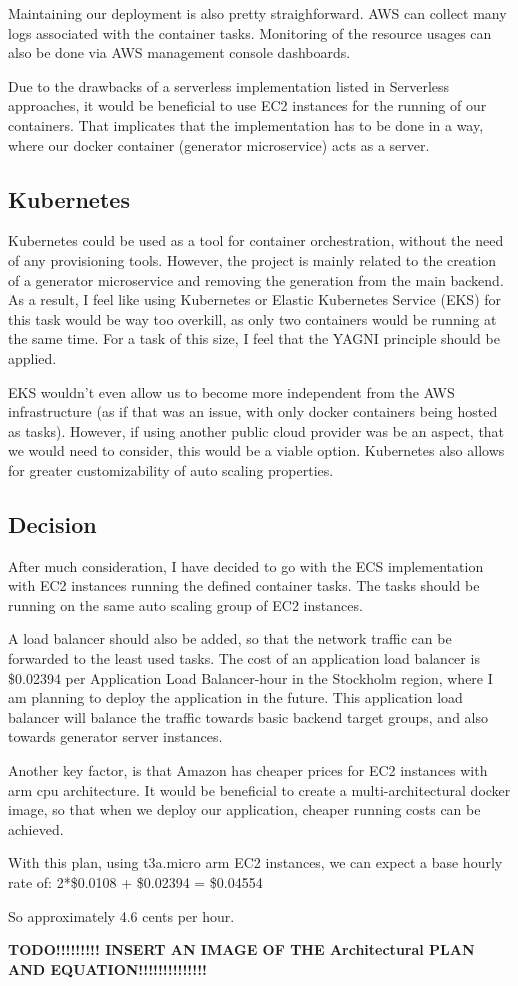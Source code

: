 		Maintaining our deployment is also pretty straighforward. AWS can collect many logs associated with 
		the container tasks. Monitoring of the resource usages can also be done via AWS management console dashboards.

		Due to the drawbacks of a serverless implementation listed in Serverless approaches, it would be beneficial to use EC2 instances
		for the running of our containers. That implicates that the implementation has to be done in a way, where our docker container (generator
		microservice) acts as a server.

	\subsection{Kubernetes}
		Kubernetes could be used as a tool for container orchestration, without the need of any provisioning tools. 
		However, the project is mainly related to the creation of a generator
		microservice and removing the generation from the main backend. As a result, I feel like using 
		Kubernetes or Elastic Kubernetes Service (EKS) for this task
		would be way too overkill, as only two containers would be running at the same time. 
		For a task of this size, I feel that the YAGNI principle should be applied.
		
		EKS wouldn't even allow us to become more independent
		from the AWS infrastructure (as if that was an issue, with only docker containers being hosted as tasks). However, if using another 
		public cloud provider was be an aspect, that we would need to consider, this would be a viable option. Kubernetes also allows for 
		greater customizability of auto scaling properties.

	\subsection{Decision} \label{awsdecision}
		After much consideration, I have decided to go with the ECS implementation with EC2 instances running the defined container tasks.
		The tasks should be running on the same auto scaling group of EC2 instances. 
		
		A load balancer should also be added, so that the 
		network traffic can be forwarded to the least used tasks. The cost of an application load balancer is \$0.02394 per Application 
		Load Balancer-hour in the Stockholm region, where I am planning to deploy the application in the future. This application load balancer
		will balance the traffic towards basic backend target groups, and also towards generator server instances.

		Another key factor, is that Amazon has cheaper prices for EC2 instances with arm cpu architecture. It would be beneficial
		to create a multi-architectural docker image, so that when we deploy our application, cheaper running costs can be 
		achieved.

		With this plan, using t3a.micro arm EC2 instances, we can expect a base hourly rate of: 2*\$0.0108 + \$0.02394 = \$0.04554

		So approximately 4.6 cents per hour.

		\textbf{TODO!!!!!!!!! INSERT AN IMAGE OF THE Architectural PLAN AND EQUATION!!!!!!!!!!!!!!}